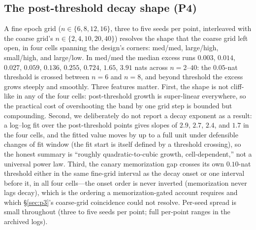 \documentclass[11pt]{article}
\begin{document}
\subsection{The post-threshold decay shape (P4)}\label{sec:p4}

A fine epoch grid ($n\in\{6,8,12,16\}$, three to five seeds per point, interleaved with
the coarse grid's $n\in\{2,4,10,20,40\}$) resolves the shape that the coarse grid left
open, in four cells spanning the design's corners: med/med, large/high, small/high, and
large/low. In med/med the median excess runs $0.003$, $0.014$, $0.027$, $0.059$,
$0.136$, $0.255$, $0.724$, $1.65$, $3.91$ nats across $n=2$--$40$: the $0.05$-nat
threshold is crossed between $n=6$ and $n=8$, and beyond threshold the excess grows
steeply and smoothly. Three features matter. First, the shape is not cliff-like in any
of the four cells: post-threshold growth is super-linear everywhere, so the practical
cost of overshooting the band by one grid step is bounded but compounding. Second, we
deliberately do not report a decay exponent as a result: a log--log fit over the
post-threshold points gives slopes of $2.9$, $2.7$, $2.4$, and $1.7$ in the four cells,
and the fitted value moves by up to a full unit under defensible changes of fit window
(the fit start is itself defined by a threshold crossing), so the honest summary is
``roughly quadratic-to-cubic growth, cell-dependent,'' not a universal power law.
Third, the canary memorization gap crosses its own $0.10$-nat threshold either in the
same fine-grid interval as the decay onset or one interval before it, in all four
cells---the onset order is never inverted (memorization never lags decay), which is the
ordering a memorization-gated account requires and which \S\ref{sec:p3}'s coarse-grid
coincidence could not resolve. Per-seed spread is small throughout (three to five seeds
per point; full per-point ranges in the archived logs).
\end{document}
